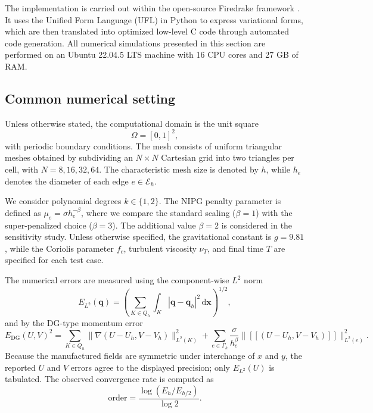 \documentclass[pdflatex,sn-mathphys-num]{sn-jnl}%
\theoremstyle{thmstyleone}%
\theoremstyle{thmstyletwo}%
\theoremstyle{thmstylethree}%
\begin{document}
The implementation is carried out within the open-source Firedrake framework \cite{Rathgeber2017}. 
It uses the Unified Form Language (UFL) \cite{Alnas2014} in Python to express variational forms, 
which are then translated into optimized low-level C code through automated code generation. All numerical simulations presented in this section are performed on an Ubuntu 22.04.5 LTS machine with 16 CPU cores and 27 GB of RAM. 

\subsection{Common numerical setting}
\label{sec:common-setting}

Unless otherwise stated, the computational domain is the unit square
\[
\Omega=[0,1]^2,
\]
with periodic boundary conditions. The mesh consists of uniform triangular meshes obtained by subdividing an $N\times N$ Cartesian grid into two triangles per cell, with $N=8,16,32,64$. The characteristic mesh size is denoted by $h$, while $h_e$ denotes the diameter of each edge $e \in \mathcal{E}_h$.

We consider polynomial degrees $k \in \{1,2\}$. The NIPG penalty parameter is defined as $\mu_e = \sigma h_e^{-\beta}$, where we compare 
the standard scaling ($\beta=1$) with the super-penalized choice ($\beta=3$). The additional value $\beta=2$ is considered in the sensitivity study. Unless otherwise specified, the gravitational constant is $g=9.81$, while the Coriolis parameter $f_c$, turbulent viscosity $\nu_T$, and final time $T$ are specified for each test case.

The numerical errors are measured using the component-wise $L^2$ norm
\begin{equation}
\label{eq:l2error}
E_{L^2}(\mathbf{q})=\left(\sum_{K\in Q_h}\int_K |\mathbf{q}-\mathbf{q}_h|^2\,\mathrm{d} \mathbf{x}\right)^{1/2},
\end{equation}
and by the DG-type momentum error
\begin{equation}
\label{eq:dgerror}
E_{\mathrm{DG}}(U,V)^2
=
\sum_{K\in Q_h}\|\nabla(U-U_h,V-V_h)\|_{L^2(K)}^2
+
\sum_{e\in\Gamma_h}\frac{\sigma}{h_e^\beta}
\|[[(U-U_h,V-V_h)]]\|_{L^2(e)}^2.
\end{equation}
Because the manufactured fields are symmetric under interchange of $x$ and $y$, the reported $U$ and $V$ errors agree to the displayed precision; only $E_{L^2}(U)$ is tabulated.
The observed convergence rate is computed as
\begin{equation}
\label{eq:observed-order}
\mathrm{order}=\frac{\log(E_h/E_{h/2})}{\log 2}.
\end{equation}
\end{document}
